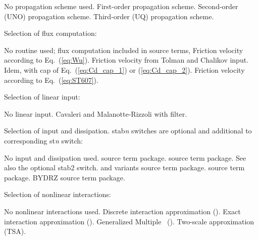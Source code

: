 \begin{slist}
 {No propagation scheme used.}
 {First-order propagation scheme.}
 {Second-order (UNO) propagation scheme.}
 {Third-order (UQ) propagation scheme.}
\end{slist}

\noindent
Selection of flux computation:
\begin{slist}
 {No routine used; flux computation included in source terms,}
 {Friction velocity according to Eq.~(\ref{eq:Wu}).}
 {Friction velocity from Tolman and Chalikov input.}
 {Idem, with cap of Eq.~(\ref{eq:Cd_cap_1}) or (\ref{eq:Cd_cap_2}).}
 {Friction velocity according to Eq.~(\ref{eq:ST607}).}
\end{slist}

\noindent
Selection of linear input:
\begin{slist}
 {No linear input.}
 {Cavaleri and Malanotte-Rizzoli with filter.}
\end{slist}

\noindent
Selection of input and dissipation. {\F stab{}\it n} switches are optional and
additional to corresponding {\F st{\it n}} switch:
\begin{slist}
 {No input and dissipation used.}
 {\wam{} source term package.}
 {\cite{tol:JPO96} source term package. See also the optional 
          {\F stab2} switch.}
 {\wam{} and variants source term package.}
 {\cite{art:Aea10} source term package.}
 {BYDRZ source term package.}
\end{slist}

\noindent
Selection of nonlinear interactions:
\begin{slist}
 {No nonlinear interactions used.}
 {Discrete interaction approximation (\dia).}
 {Exact interaction approximation (\xnl).}
 {Generalized Multiple \dia\ (\gmd).}
 {Two-scale approximation (TSA).} 
\end{slist}

